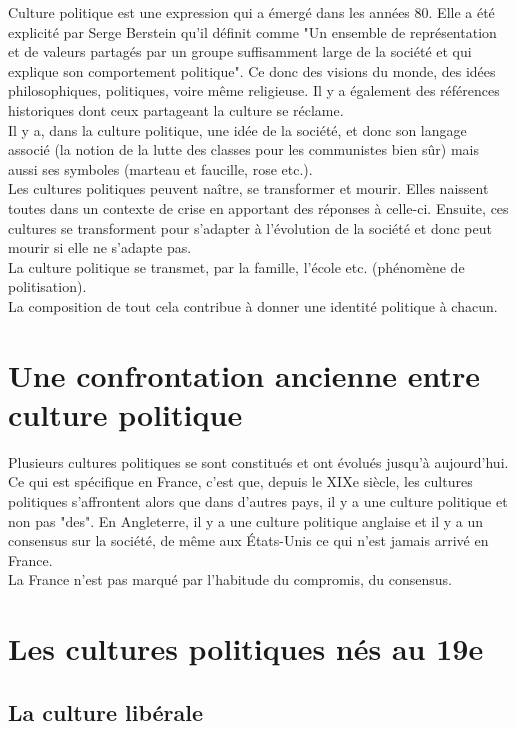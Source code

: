 \documentclass[12pt, a4paper, openany]{book}
\begin{document}
Culture politique est une expression qui a émergé dans les années 80. Elle a été explicité par Serge Berstein qu'il définit comme "Un ensemble de représentation et de valeurs partagés par un groupe suffisamment large de la société et qui explique son comportement politique". Ce donc des visions du monde, des idées philosophiques, politiques, voire même religieuse. Il y a également des références historiques dont ceux partageant la culture se réclame. \\
Il y a, dans la culture politique, une idée de la société, et donc son langage associé (la notion de la lutte des classes pour les communistes bien sûr) mais aussi ses symboles (marteau et faucille, rose etc.). \\
Les cultures politiques peuvent naître, se transformer et mourir. Elles naissent toutes dans un contexte de crise en apportant des réponses à celle-ci. Ensuite, ces cultures se transforment pour s'adapter à l'évolution de la société et donc peut mourir si elle ne s'adapte pas. \\
La culture politique se transmet, par la famille, l'école etc. (phénomène de politisation). \\
La composition de tout cela contribue à donner une identité politique à chacun.

\section{Une confrontation ancienne entre culture politique}

Plusieurs cultures politiques se sont constitués et ont évolués jusqu'à aujourd'hui. \\
Ce qui est spécifique en France, c'est que, depuis le XIXe siècle, les cultures politiques s'affrontent alors que dans d'autres pays, il y a une culture politique et non pas "des". En Angleterre, il y a une culture politique anglaise et il y a un consensus sur la société, de même aux États-Unis ce qui n'est jamais arrivé en France. \\
La France n'est pas marqué par l'habitude du compromis, du consensus.

\section{Les cultures politiques nés au 19e}

\subsection{La culture libérale}
\end{document}
